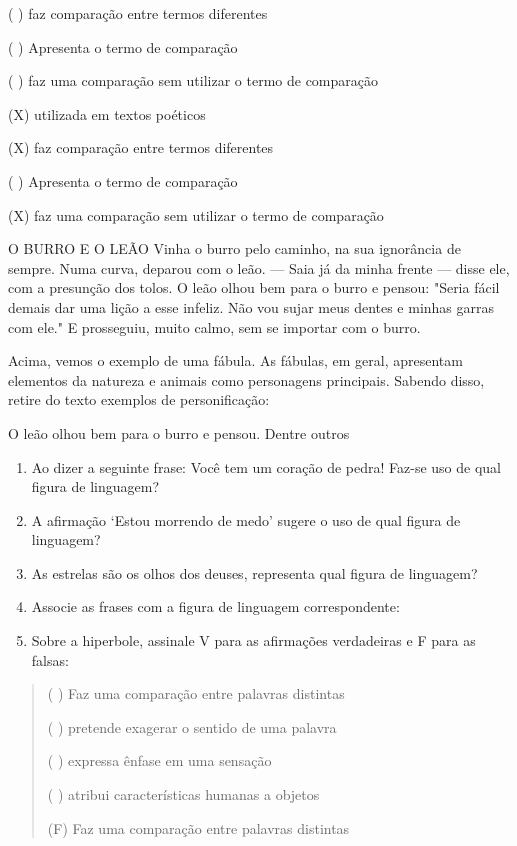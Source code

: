 {{( ) faz comparação entre termos diferentes

( ) Apresenta o termo de comparação

( ) faz uma comparação sem utilizar o termo de comparação

(X) utilizada em textos poéticos

(X) faz comparação entre termos diferentes

( ) Apresenta o termo de comparação

(X) faz uma comparação sem utilizar o termo de comparação

O BURRO E O LEÃO Vinha o burro pelo caminho, na sua ignorância de
sempre. Numa curva, deparou com o leão. --- Saia já da minha frente ---
disse ele, com a presunção dos tolos. O leão olhou bem para o burro e
pensou: "Seria fácil demais dar uma lição a esse infeliz. Não vou sujar
meus dentes e minhas garras com ele." E prosseguiu, muito calmo, sem se
importar com o burro.

Acima, vemos o exemplo de uma fábula. As fábulas, em geral, apresentam
elementos da natureza e animais como personagens principais. Sabendo
disso, retire do texto exemplos de personificação:

O leão olhou bem para o burro e pensou. Dentre outros

\begin{enumerate}
\def\labelenumi{\arabic{enumi})}
\setcounter{enumi}{2}
\item
  Ao dizer a seguinte frase: Você tem um coração de pedra! Faz-se uso de
  qual figura de linguagem?
\item
  A afirmação `Estou morrendo de medo' sugere o uso de qual figura de
  linguagem?
\item
  As estrelas são os olhos dos deuses, representa qual figura de
  linguagem?
\item
  Associe as frases com a figura de linguagem correspondente:
\item
  Sobre a hiperbole, assinale V para as afirmações verdadeiras e F para
  as falsas:
\end{enumerate}

\begin{quote}
( ) Faz uma comparação entre palavras distintas

( ) pretende exagerar o sentido de uma palavra

( ) expressa ênfase em uma sensação

( ) atribui características humanas a objetos

(F) Faz uma comparação entre palavras distintas


\end{quote}}}
